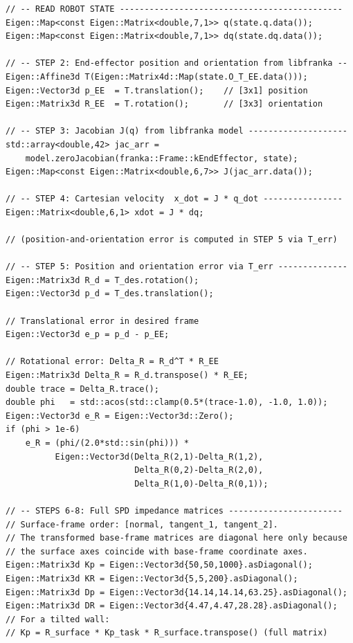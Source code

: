 \begin{lstlisting}[style=cppstyle,
  caption={One iteration of the Panda 7-DOF impedance control loop
           (\texttt{libfranka} torque callback, 1\,ms period)},
  label={lst:panda}]
// -- READ ROBOT STATE ---------------------------------------------
Eigen::Map<const Eigen::Matrix<double,7,1>> q(state.q.data());
Eigen::Map<const Eigen::Matrix<double,7,1>> dq(state.dq.data());

// -- STEP 2: End-effector position and orientation from libfranka --
Eigen::Affine3d T(Eigen::Matrix4d::Map(state.O_T_EE.data()));
Eigen::Vector3d p_EE  = T.translation();    // [3x1] position
Eigen::Matrix3d R_EE  = T.rotation();       // [3x3] orientation

// -- STEP 3: Jacobian J(q) from libfranka model --------------------
std::array<double,42> jac_arr =
    model.zeroJacobian(franka::Frame::kEndEffector, state);
Eigen::Map<const Eigen::Matrix<double,6,7>> J(jac_arr.data());

// -- STEP 4: Cartesian velocity  x_dot = J * q_dot ----------------
Eigen::Matrix<double,6,1> xdot = J * dq;

// (position-and-orientation error is computed in STEP 5 via T_err)

// -- STEP 5: Position and orientation error via T_err --------------
Eigen::Matrix3d R_d = T_des.rotation();
Eigen::Vector3d p_d = T_des.translation();

// Translational error in desired frame
Eigen::Vector3d e_p = p_d - p_EE;

// Rotational error: Delta_R = R_d^T * R_EE
Eigen::Matrix3d Delta_R = R_d.transpose() * R_EE;
double trace = Delta_R.trace();
double phi   = std::acos(std::clamp(0.5*(trace-1.0), -1.0, 1.0));
Eigen::Vector3d e_R = Eigen::Vector3d::Zero();
if (phi > 1e-6)
    e_R = (phi/(2.0*std::sin(phi))) *
          Eigen::Vector3d(Delta_R(2,1)-Delta_R(1,2),
                          Delta_R(0,2)-Delta_R(2,0),
                          Delta_R(1,0)-Delta_R(0,1));

// -- STEPS 6-8: Full SPD impedance matrices -----------------------
// Surface-frame order: [normal, tangent_1, tangent_2].
// The transformed base-frame matrices are diagonal here only because
// the surface axes coincide with base-frame coordinate axes.
Eigen::Matrix3d Kp = Eigen::Vector3d{50,50,1000}.asDiagonal();
Eigen::Matrix3d KR = Eigen::Vector3d{5,5,200}.asDiagonal();
Eigen::Matrix3d Dp = Eigen::Vector3d{14.14,14.14,63.25}.asDiagonal();
Eigen::Matrix3d DR = Eigen::Vector3d{4.47,4.47,28.28}.asDiagonal();
// For a tilted wall:
// Kp = R_surface * Kp_task * R_surface.transpose() (full matrix)


\end{lstlisting}
